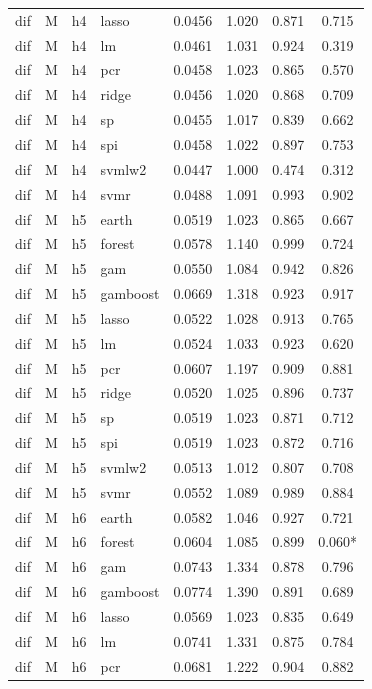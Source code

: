 \begin{ThreePartTable}
\begin{longtable}[t]{llclcccc}
dif & M & h4 & lasso & 0.0456 & 1.020 & 0.871 & 0.715\\
dif & M & h4 & lm & 0.0461 & 1.031 & 0.924 & 0.319\\
dif & M & h4 & pcr & 0.0458 & 1.023 & 0.865 & 0.570\\
dif & M & h4 & ridge & 0.0456 & 1.020 & 0.868 & 0.709\\
dif & M & h4 & sp & 0.0455 & 1.017 & 0.839 & 0.662\\
dif & M & h4 & spi & 0.0458 & 1.022 & 0.897 & 0.753\\
dif & M & h4 & svmlw2 & 0.0447 & 1.000 & 0.474 & 0.312\\
dif & M & h4 & svmr & 0.0488 & 1.091 & 0.993 & 0.902\\
\addlinespace
dif & M & h5 & earth & 0.0519 & 1.023 & 0.865 & 0.667\\
dif & M & h5 & forest & 0.0578 & 1.140 & 0.999 & 0.724\\
dif & M & h5 & gam & 0.0550 & 1.084 & 0.942 & 0.826\\
dif & M & h5 & gamboost & 0.0669 & 1.318 & 0.923 & 0.917\\
dif & M & h5 & lasso & 0.0522 & 1.028 & 0.913 & 0.765\\
dif & M & h5 & lm & 0.0524 & 1.033 & 0.923 & 0.620\\
dif & M & h5 & pcr & 0.0607 & 1.197 & 0.909 & 0.881\\
dif & M & h5 & ridge & 0.0520 & 1.025 & 0.896 & 0.737\\
dif & M & h5 & sp & 0.0519 & 1.023 & 0.871 & 0.712\\
dif & M & h5 & spi & 0.0519 & 1.023 & 0.872 & 0.716\\
dif & M & h5 & svmlw2 & 0.0513 & 1.012 & 0.807 & 0.708\\
dif & M & h5 & svmr & 0.0552 & 1.089 & 0.989 & 0.884\\
\addlinespace
dif & M & h6 & earth & 0.0582 & 1.046 & 0.927 & 0.721\\
dif & M & h6 & forest & 0.0604 & 1.085 & 0.899 & 0.060*\\
dif & M & h6 & gam & 0.0743 & 1.334 & 0.878 & 0.796\\
dif & M & h6 & gamboost & 0.0774 & 1.390 & 0.891 & 0.689\\
dif & M & h6 & lasso & 0.0569 & 1.023 & 0.835 & 0.649\\
dif & M & h6 & lm & 0.0741 & 1.331 & 0.875 & 0.784\\
dif & M & h6 & pcr & 0.0681 & 1.222 & 0.904 & 0.882\\

\end{longtable}
\end{ThreePartTable}

